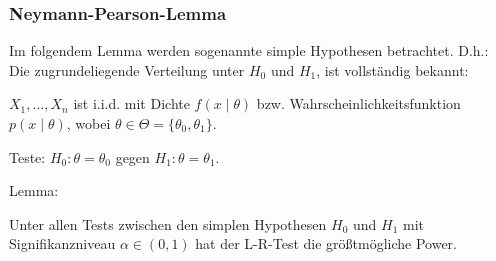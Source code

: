 \documentclass[10pt]{article}
\newcommand{\FZV}{X_1, \ldots, X_n} %
\begin{document}
	\subsubsection{Neymann-Pearson-Lemma}
	
	Im folgendem Lemma werden sogenannte simple Hypothesen betrachtet. D.h.: Die zugrundeliegende Verteilung unter $H_0$ und $H_1$, ist vollständig bekannt:
	
	$\FZV$ ist i.i.d. mit Dichte $f(x\mid \theta)$ bzw. Wahrscheinlichkeitsfunktion $p(x\mid \theta)$, wobei $\theta \in \Theta = \{\theta_0, \theta_1\}$. 
	
	Teste: $H_0: \theta = \theta_0$ gegen $H_1: \theta = \theta_1.$
	
	Lemma:
	
	Unter allen Tests zwischen den simplen Hypothesen $H_0$ und $H_1$ mit Signifikanzniveau $\alpha \in (0,1)$ hat der L-R-Test die größtmögliche Power. 
	
\end{document}
